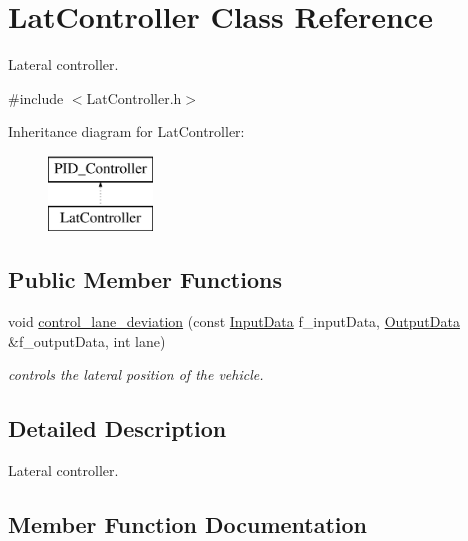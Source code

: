 \hypertarget{class_lat_controller}{}\section{Lat\+Controller Class Reference}
\label{class_lat_controller}


Lateral controller.  




{\ttfamily \#include $<$Lat\+Controller.\+h$>$}

Inheritance diagram for Lat\+Controller\+:\begin{figure}[H]
\begin{center}
\leavevmode
\includegraphics[height=2.000000cm]{class_lat_controller}
\end{center}
\end{figure}
\subsection*{Public Member Functions}
\begin{DoxyCompactItemize}
\item 
void \mbox{\hyperlink{class_lat_controller_aba54ffa92751d27c37fb7f3ec5a9065a}{control\+\_\+lane\+\_\+deviation}} (const \mbox{\hyperlink{struct_input_data}{Input\+Data}} f\+\_\+input\+Data, \mbox{\hyperlink{struct_output_data}{Output\+Data}} \&f\+\_\+output\+Data, int lane)
\begin{DoxyCompactList}\small\item\em controls the lateral position of the vehicle. \end{DoxyCompactList}\end{DoxyCompactItemize}


\subsection{Detailed Description}
Lateral controller. 

\subsection{Member Function Documentation}
\mbox{\label{class_lat_controller_aba54ffa92751d27c37fb7f3ec5a9065a}} 
